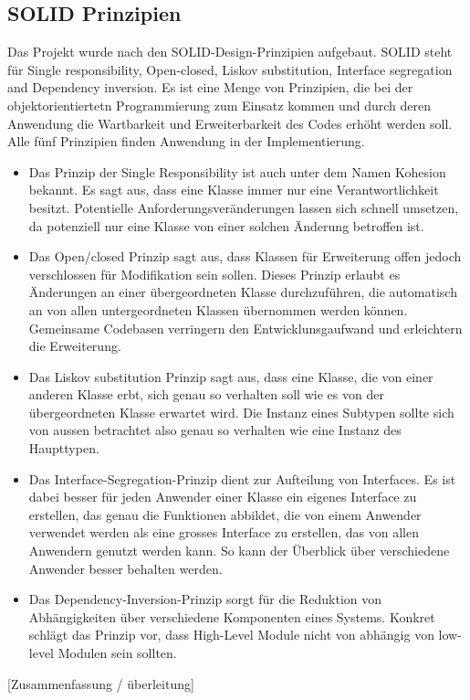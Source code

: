 



\subsection{SOLID Prinzipien}

Das Projekt wurde nach den SOLID-Design-Prinzipien aufgebaut. SOLID steht für Single responsibility, Open-closed, Liskov substitution, Interface segregation and Dependency inversion. Es ist eine Menge von Prinzipien, die bei der objektorientiertetn Programmierung zum Einsatz kommen und durch deren Anwendung die Wartbarkeit und Erweiterbarkeit des Codes erhöht werden soll. Alle fünf Prinzipien finden Anwendung in der Implementierung.

\begin{itemize}
\item Das Prinzip der Single Responsibility ist auch unter dem Namen Kohesion bekannt. Es sagt aus, dass eine Klasse immer nur eine Verantwortlichkeit besitzt.  Potentielle Anforderungsveränderungen lassen sich schnell umsetzen, da potenziell nur eine Klasse von einer solchen Änderung betroffen ist.

\item Das Open/closed Prinzip sagt aus, dass Klassen für Erweiterung offen jedoch verschlossen für Modifikation sein sollen. Dieses Prinzip erlaubt es Änderungen an einer übergeordneten Klasse durchzuführen, die automatisch an von allen untergeordneten Klassen übernommen werden können. Gemeinsame Codebasen verringern den Entwicklunsgaufwand und erleichtern die Erweiterung.

\item Das Liskov substitution Prinzip sagt aus, dass eine Klasse, die von einer anderen Klasse erbt, sich genau so verhalten soll wie es von der übergeordneten Klasse erwartet wird. Die Instanz eines Subtypen sollte sich von aussen betrachtet also genau so verhalten wie eine Instanz des Haupttypen.

\item Das Interface-Segregation-Prinzip dient zur Aufteilung von Interfaces. Es ist dabei besser für jeden Anwender einer Klasse ein eigenes Interface zu erstellen, das genau die Funktionen abbildet, die von einem Anwender verwendet werden als eine grosses Interface zu erstellen, das von allen Anwendern genutzt werden kann. So kann der Überblick über verschiedene Anwender besser behalten werden.

\item Das Dependency-Inversion-Prinzip sorgt für die Reduktion von Abhängigkeiten über verschiedene Komponenten eines Systems. Konkret schlägt das Prinzip vor, dass High-Level Module nicht von abhängig von low-level Modulen sein sollten.

\end{itemize}

[Zusammenfassung / überleitung]
